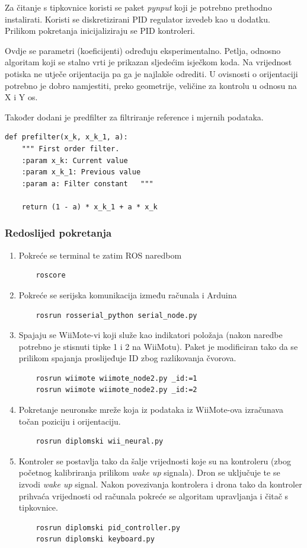 \documentclass[times, utf8, diplomski]{fer}
\begin{document}
Za čitanje s tipkovnice koristi se paket \emph{pynput} koji je potrebno prethodno instalirati.
Koristi se diskretizirani PID regulator izvedeb kao u dodatku.  Prilikom pokretanja inicijaliziraju se PID kontroleri. 

Ovdje se parametri (koeficijenti) određuju eksperimentalno. 
Petlja, odnosno algoritam koji se stalno vrti je prikazan sljedećim isječkom koda. Na vrijednost potiska ne utječe orijentacija pa ga je najlakše odrediti. U ovisnosti o orijentaciji potrebno je dobro namjestiti, preko geometrije, veličine za kontrolu u odnosu na X i Y os.   

Također dodani je predfilter za filtriranje reference i mjernih podataka.
\begin{lstlisting}
def prefilter(x_k, x_k_1, a):
	""" First order filter.
	:param x_k: Current value
	:param x_k_1: Previous value
	:param a: Filter constant	"""
	
	return (1 - a) * x_k_1 + a * x_k \end{lstlisting}


\subsubsection{Redoslijed pokretanja}
\begin{enumerate}
	\item Pokreće se terminal te zatim ROS naredbom
	\begin{lstlisting}
	roscore	\end{lstlisting}
	\item Pokreće se serijska komunikacija između računala i Arduina
	\begin{lstlisting}
	rosrun rosserial_python serial_node.py	\end{lstlisting}
	\item Spajaju se WiiMote-vi koji služe kao indikatori položaja (nakon naredbe potrebno je stisnuti tipke 1 i 2 na WiiMotu). Paket je modificiran tako da se prilikom spajanja proslijeđuje ID zbog razlikovanja čvorova.
	\begin{lstlisting}
	rosrun wiimote wiimote_node2.py _id:=1
	rosrun wiimote wiimote_node2.py _id:=2	\end{lstlisting}
	\item Pokretanje neuronske mreže koja iz podataka iz WiiMote-ova izračunava točan poziciju i orijentaciju.
	\begin{lstlisting}
	rosrun diplomski wii_neural.py \end{lstlisting}
	\item Kontroler se postavlja tako da šalje vrijednosti koje su na kontroleru (zbog početnog kalibriranja prilikom \emph{wake up} signala). Dron se uključuje te se izvodi \emph{wake up} signal. Nakon povezivanja kontrolera i drona tako da kontroler prihvaća vrijednosti od računala pokreće se algoritam upravljanja i čitač s tipkovnice.
	\begin{lstlisting}
	rosrun diplomski pid_controller.py
	rosrun diplomski keyboard.py \end{lstlisting}
\end{enumerate}
\end{document}
